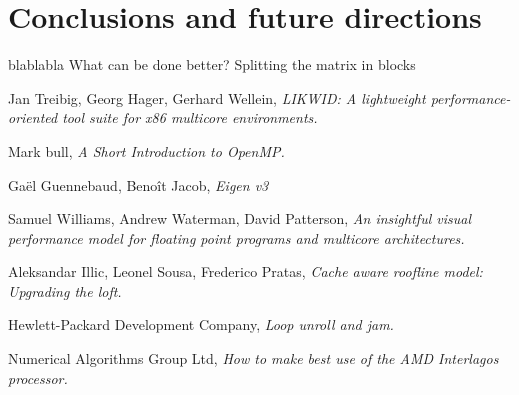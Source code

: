 \documentclass[11pt,a4paper,oneside,titlepage,openright]{book}
\begin{document}
\chapter{Conclusions and future directions} 

blablabla
What can be done better? Splitting the matrix in blocks 

\begin{thebibliography}{1}

Jan Treibig, Georg Hager, Gerhard Wellein, \textit{LIKWID: A lightweight performance-oriented tool suite for x86 multicore environments.}
 
Mark bull, \textit{A Short Introduction to OpenMP.}

Ga\"{e}l Guennebaud, Beno\^{i}t Jacob, \textit{Eigen v3}

Samuel Williams, Andrew Waterman, David Patterson, \textit{An insightful visual performance model for floating point programs and multicore architectures.}

Aleksandar Illic, Leonel Sousa, Frederico Pratas, \textit{Cache aware roofline model: Upgrading the loft.}

Hewlett-Packard Development Company, \textit{Loop unroll and jam.}


Numerical Algorithms Group Ltd, \textit{How to make best use of the AMD Interlagos processor.}
\end{thebibliography}
 
 
 
 
 
\end{document}
